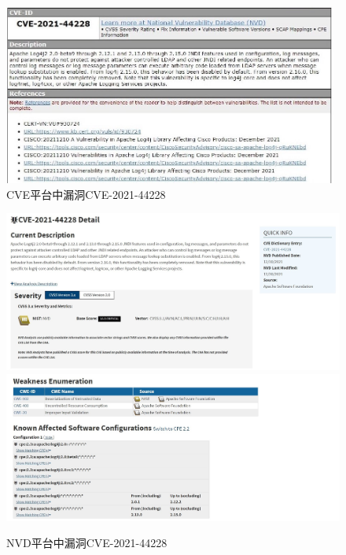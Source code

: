 \begin{figure}[!t]
    \centering
    \includegraphics[width=0.98\textwidth]{fig/CVE-2021-44228-2}
    \caption{CVE平台中漏洞CVE-2021-44228}\label{fig:CVE-2021-44228}
\end{figure}

\begin{figure}[!t]
    \centering
    \includegraphics[width=1.0\textwidth]{fig/NVD-2021-44228}
    \includegraphics[width=1.0\textwidth]{fig/NVD-2021-44228-2}\caption{NVD平台中漏洞CVE-2021-44228}
    \label{fig:NVD-2021-44228}
\end{figure}


